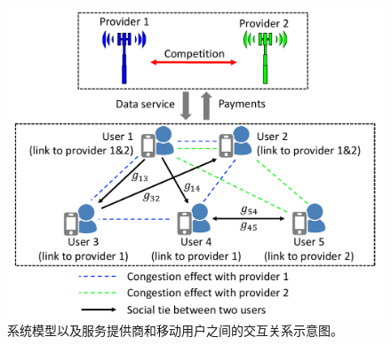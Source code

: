 \begin{figure}[htb]
\centering
\includegraphics[scale=0.6]{./pic/scheme0.pdf}
\vspace{-0.0cm}
\caption{系统模型以及服务提供商和移动用户之间的交互关系示意图。}\label{fg:scheme}
\end{figure}


